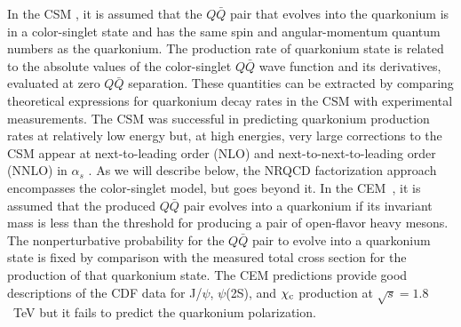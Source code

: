 \documentclass[aps,prc,preprint,superscriptaddress,showpacs,showkeys,amsmath]{revtex4-1}
\begin{document}
  In the CSM \cite{Einhorn:1975ua,Ellis:1976fj,Carlson:1976cd,Berger:1980ni},
it is assumed that the $Q\bar Q$ pair that evolves into
the quarkonium is in a color-singlet state and has the same spin
and angular-momentum quantum numbers as the quarkonium. 
 The production rate of quarkonium state is related to 
the absolute values of the color-singlet $Q\bar Q$ wave function and 
its derivatives, evaluated at zero $Q\bar Q$ separation. These quantities 
can be extracted by comparing theoretical expressions for quarkonium decay
rates in the CSM with experimental measurements. 
 The CSM was successful in predicting quarkonium production rates at
relatively low energy \cite{Schuler:1994hy} but, at high
energies, very large corrections to the CSM appear at next-to-leading
order (NLO) and next-to-next-to-leading order (NNLO) in $\alpha_s$
\cite{Artoisenet:2007xi,Campbell:2007ws,Artoisenet:2008fc}.
As we will describe below, the NRQCD factorization approach encompasses
the color-singlet model, but goes beyond it.
    In the CEM~\cite{Fritzsch:1977ay,Amundson:1995em,Amundson:1996qr}, it
is assumed that the produced $Q\bar Q$ pair evolves into a quarkonium
if its invariant mass is less than the threshold for producing a 
pair of open-flavor heavy mesons. 
 The nonperturbative probability for the $Q\bar Q$ pair to evolve into 
a quarkonium state is fixed by comparison with the measured total 
cross section for the production of that quarkonium state.
 The CEM predictions provide good descriptions of the CDF data for J/$\psi$,
$\psi$(2S), and $\chi_{\rm c}$ production at $\sqrt{s}=1.8$~TeV
\cite{Amundson:1996qr} but it fails to predict the quarkonium 
polarization.

\end{document}
